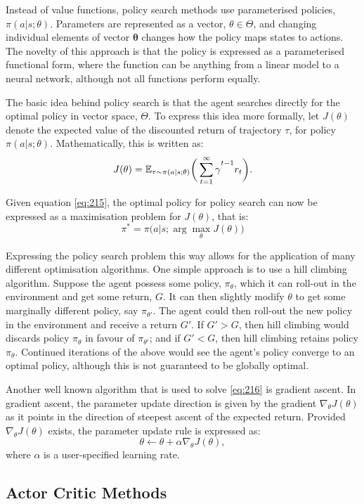 Instead of value functions, policy search methods use parameterised policies, $\pi(a | s;\theta)$. Parameters are represented as a vector, $\theta \in \Theta$, and changing individual elements of vector $\mathbf{\theta}$ changes how the policy maps states to actions. The novelty of this approach is that the policy is expressed as a parameterised functional form, where the function can be anything from a linear model to a neural network, although not all functions perform equally.

The basic idea behind policy search is that the agent searches directly for the optimal policy in vector space, $\Theta$. To express this idea more formally, let $J(\theta)$ denote the expected value of the discounted return of trajectory $\tau$, for policy $\pi(a|s;\theta)$. Mathematically, this is written as:
\begin{equation}
	J(\theta) = \mathbb{E}_{\tau \sim \pi(a|s;\theta)} \bigg( \sum_{t=1}^{\infty} \gamma\mystrut^{t-1} r_t \bigg). \label{eq:215}
\end{equation}

Given equation \ref{eq:215}, the optimal policy for policy search can now be expressed as a maximisation problem  for $J(\theta)$, that is: 
\begin{equation}
	\pi^* = \pi\big(a|s;\arg\max_{\theta} J(\theta)\big) \label{eq:216}
\end{equation}

Expressing the policy search problem this way allows for the application of many different optimisation algorithms. One simple approach is to use a hill climbing algorithm. Suppose the agent possess some policy, $\pi_{\theta}$, which it can roll-out in the environment and get some return, $G$. It can then slightly modify $\theta$ to get some marginally different policy, say $\pi_{\theta'}$. The agent could then roll-out the new policy in the environment and receive a return $G'$. If $G' > G$, then hill climbing would discards policy $\pi_{\theta}$ in favour of $\pi_{\theta'}$; and if $G' < G$, then hill climbing retains policy $\pi_{\theta}$. Continued iterations of the above would see the agent's policy converge to an optimal policy, although this is not guaranteed to be globally optimal.

Another well known algorithm that is used to solve \ref{eq:216} is gradient ascent. In gradient ascent, the parameter update direction is given by the gradient $\nabla_{\theta} J(\theta)$ as it points in the direction of steepest ascent of the expected return. Provided $\nabla_{\theta} J(\theta)$ exists, the parameter update rule is expressed as:
\begin{equation}
	\theta \gets \theta + \alpha \nabla_{\theta}J(\theta),
\end{equation}
where $\alpha$ is a user-specified learning rate.



\subsection{Actor Critic Methods}